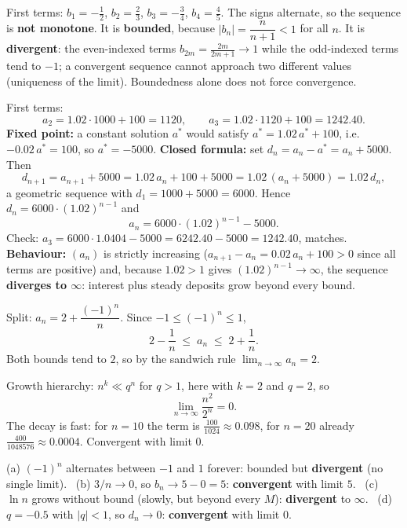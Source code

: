 \begin{solutions}
  \item First terms: $b_{1}=-\tfrac{1}{2}$, $b_{2}=\tfrac{2}{3}$,
        $b_{3}=-\tfrac{3}{4}$, $b_{4}=\tfrac{4}{5}$. The signs alternate,
        so the sequence is \textbf{not monotone}. It is \textbf{bounded},
        because $|b_{n}|=\dfrac{n}{n+1}<1$ for all $n$. It is
        \textbf{divergent}: the even-indexed terms
        $b_{2m}=\tfrac{2m}{2m+1}\to 1$ while the odd-indexed terms tend to
        $-1$; a convergent sequence cannot approach two different values
        (uniqueness of the limit). Boundedness alone does not force
        convergence.

  \item First terms:
        \[
          a_{2}=1.02\cdot 1000+100=1120 ,\qquad
          a_{3}=1.02\cdot 1120+100=1242.40 .
        \]
        \textbf{Fixed point:} a constant solution $a^{*}$ would satisfy
        $a^{*}=1.02\,a^{*}+100$, i.e.\ $-0.02\,a^{*}=100$, so
        $a^{*}=-5000$. \textbf{Closed formula:} set
        $d_{n}=a_{n}-a^{*}=a_{n}+5000$. Then
        \[
          d_{n+1}=a_{n+1}+5000=1.02\,a_{n}+100+5000
                 =1.02\,(a_{n}+5000)=1.02\,d_{n} ,
        \]
        a geometric sequence with $d_{1}=1000+5000=6000$. Hence
        $d_{n}=6000\cdot(1.02)^{n-1}$ and
        \[
          a_{n}=6000\cdot(1.02)^{n-1}-5000 .
        \]
        Check: $a_{3}=6000\cdot 1.0404-5000=6242.40-5000=1242.40$,
        matches. \textbf{Behaviour:} $(a_{n})$ is strictly increasing
        ($a_{n+1}-a_{n}=0.02\,a_{n}+100>0$ since all terms are positive)
        and, because $1.02>1$ gives $(1.02)^{n-1}\to\infty$, the sequence
        \textbf{diverges to $\infty$}: interest plus steady deposits grow
        beyond every bound.

  \item Split: $a_{n}=2+\dfrac{(-1)^{n}}{n}$. Since
        $-1\leq(-1)^{n}\leq 1$,
        \[
          2-\frac{1}{n}\;\leq\;a_{n}\;\leq\;2+\frac{1}{n} .
        \]
        Both bounds tend to $2$, so by the sandwich rule
        $\lim_{n\to\infty}a_{n}=2$.

  \item Growth hierarchy: $n^{k}\ll q^{n}$ for $q>1$, here with $k=2$ and
        $q=2$, so
        \[
          \lim_{n\to\infty}\frac{n^{2}}{2^{n}}=0 .
        \]
        The decay is fast: for $n=10$ the term is
        $\tfrac{100}{1024}\approx 0.098$, for $n=20$ already
        $\tfrac{400}{1048576}\approx 0.0004$. Convergent with limit $0$.

  \item (a) $(-1)^{n}$ alternates between $-1$ and $1$ forever: bounded
        but \textbf{divergent} (no single limit). \
        (b) $3/n\to 0$, so $b_{n}\to 5-0=5$: \textbf{convergent} with
        limit $5$. \
        (c) $\ln n$ grows without bound (slowly, but beyond every $M$):
        \textbf{divergent} to $\infty$. \
        (d) $q=-0.5$ with $|q|<1$, so $d_{n}\to 0$: \textbf{convergent}
        with limit $0$.
\end{solutions}

